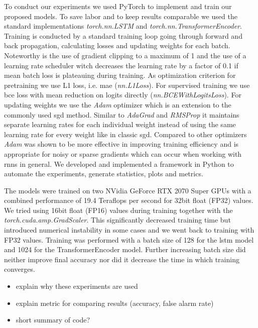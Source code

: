 To conduct our experiments we used PyTorch \cite{pytorch} to implement and train our proposed models. To save labor and to keep results comparable we used the standard implementations \textit{torch.nn.LSTM} and \textit{torch.nn.TransformerEncoder}. Training is conducted by a standard training loop going through forward and back propagation, calculating losses and updating weights for each batch. Noteworthy is the use of gradient clipping to a maximum of 1 and the use of a learning rate scheduler witch decreases the learning rate by a factor of 0.1 if mean batch loss is plateauing during training. As optimization criterion for pretraining we use L1 loss, i.e. \gls{mae} (\textit{nn.L1Loss}). For supervised training we use \gls{bce} loss with mean reduction on logits directly (\textit{nn.BCEWithLogitsLoss}).
For updating weights we use the \textit{Adam} optimizer \cite{adam} which is an extension to the commonly used \gls{sgd} method. Similar to \textit{AdaGrad} \cite{optimizer_comparison} and \textit{RMSProp} \cite{optimizer_comparison} it maintains separate learning rates for each individual weight instead of using the same learning rate for every weight like in classic \gls{sgd}. Compared to other optimizers \textit{Adam} was shown to be more effective in improving training efficiency \cite{adam} and is appropriate for noisy or sparse gradients which can occur when working with \glspl{rnn} in general.
We developed and implemented a framework in Python to automate the experiments, generate statistics, plots and metrics. \par
The models were trained on two NVidia GeForce RTX 2070 Super GPUs with a combined performance of 19.4 Teraflops per second for 32bit float (FP32) values. We tried using 16bit float (FP16) values during training together with the \textit{torch.cuda.amp.GradScaler}. This significantly decreased training time but introduced numerical instability in some cases and we went back to training with FP32 values. Training was performed with a batch size of 128 for the \gls{lstm} model and 1024 for the TransformerEncoder model. Further increasing batch size did neither improve final accuracy nor did it decrease the time in which training converges. \par

\begin{itemize}
	\item explain why these experiments are used
	\item explain metric for comparing results (accuracy, false alarm rate)
	\item short summary of code?
\end{itemize}

